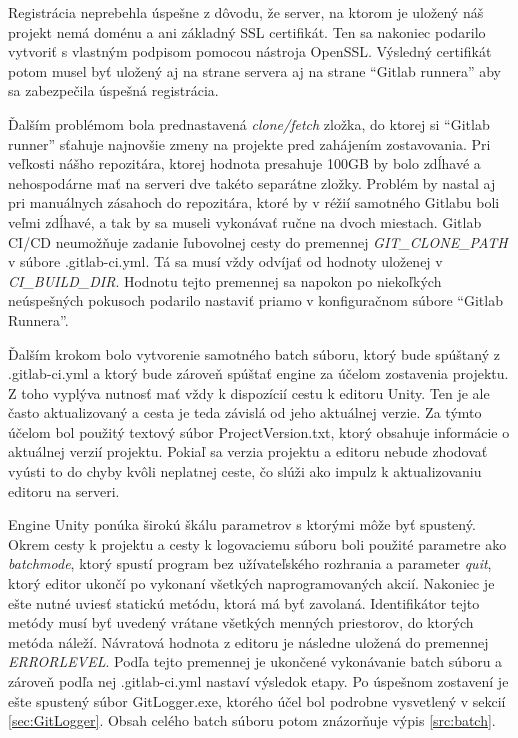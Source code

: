 \documentclass[slovak, bachelorpractice]{diploma}
\begin{document}
Registrácia neprebehla úspešne z dôvodu, že server, na ktorom je uložený náš projekt nemá doménu a ani základný SSL certifikát. Ten sa nakoniec podarilo vytvoriť s vlastným podpisom pomocou nástroja OpenSSL. Výsledný certifikát potom musel byť uložený aj na strane servera aj na strane \enquote{Gitlab runnera} aby sa  zabezpečila úspešná registrácia.

Ďalším problémom bola prednastavená \textit{clone/fetch} zložka, do ktorej si \enquote{Gitlab runner} sťahuje najnovšie zmeny na projekte pred zahájením zostavovania. Pri veľkosti nášho repozitára, ktorej hodnota presahuje 100GB by bolo zdĺhavé a nehospodárne mať na serveri dve takéto separátne zložky. Problém by nastal aj pri manuálnych zásahoch do repozitára, ktoré by v réžií samotného Gitlabu boli veľmi zdĺhavé, a tak by sa museli vykonávať ručne na dvoch miestach. Gitlab CI/CD neumožňuje zadanie ľubovolnej cesty do premennej \textit{GIT\_CLONE\_PATH} v súbore .gitlab-ci.yml. Tá sa musí vždy odvíjať od hodnoty uloženej v \textit{CI\_BUILD\_DIR}. Hodnotu tejto premennej sa napokon po niekoľkých neúspešných pokusoch podarilo nastaviť priamo v konfiguračnom súbore \enquote{Gitlab Runnera}.

Ďalším krokom bolo vytvorenie samotného batch súboru, ktorý bude spúštaný z .gitlab-ci.yml a ktorý bude zároveň spúštať engine za účelom zostavenia projektu. Z toho vyplýva nutnosť mať vždy k dispozícií cestu k editoru Unity. Ten je ale často aktualizovaný a cesta je teda závislá od jeho aktuálnej verzie. Za týmto účelom bol použitý textový súbor ProjectVersion.txt, ktorý obsahuje informácie o aktuálnej verzií projektu. Pokiaľ sa verzia projektu a editoru nebude zhodovať vyústi to do chyby kvôli neplatnej ceste, čo slúži ako impulz k aktualizovaniu editoru na serveri.

Engine Unity ponúka širokú škálu parametrov s ktorými môže byť spustený. Okrem cesty k projektu a cesty k logovaciemu súboru boli použité parametre ako \textit{batchmode}, ktorý spustí program bez užívateľského rozhrania a parameter \textit{quit}, ktorý editor ukončí po vykonaní všetkých naprogramovaných akcií. Nakoniec je ešte nutné uviesť statickú metódu, ktorá má byť zavolaná. Identifikátor tejto metódy musí byť uvedený vrátane všetkých menných priestorov, do ktorých metóda náleží. Návratová hodnota z editoru je následne uložená do premennej \textit{ERRORLEVEL}. Podľa tejto premennej je ukončené vykonávanie batch súboru a zároveň podľa nej .gitlab-ci.yml nastaví výsledok etapy. Po úspešnom zostavení je ešte spustený súbor GitLogger.exe, ktorého účel bol podrobne vysvetlený v sekcií \ref{sec:GitLogger}. Obsah celého batch súboru potom znázorňuje výpis \ref{src:batch}.
\end{document}
